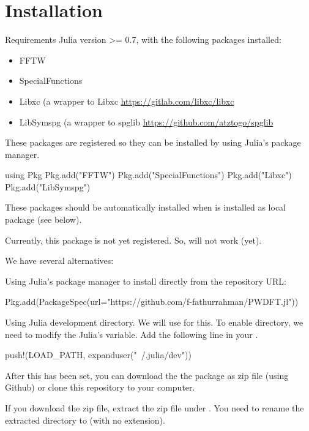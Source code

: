 \section{Installation}

Requirements Julia version >= 0.7, with the following packages installed:
\begin{itemize}
\item FFTW
\item SpecialFunctions
\item Libxc (a wrapper to Libxc {\footnotesize \url{https://gitlab.com/libxc/libxc}}
\item LibSymspg (a wrapper to spglib {\footnotesize \url{https://github.com/atztogo/spglib}}
\end{itemize}

These packages are registered so they can be installed by using Julia's package manager.

\begin{juliacode}
using Pkg
Pkg.add("FFTW")
Pkg.add("SpecialFunctions")
Pkg.add("Libxc")
Pkg.add("LibSymspg")
\end{juliacode}

These packages should be automatically installed when
 is installed as local package (see below).

Currently, this package is not yet registered.
So,  will not work (yet).

We have several alternatives:

Using Julia's package manager to install directly from the repository URL:

\begin{juliacode}
Pkg.add(PackageSpec(url="https://github.com/f-fathurrahman/PWDFT.jl"))  
\end{juliacode}

Using Julia development directory. We will use 
for this. To enable  directory, we need to modify the Julia's
 variable. Add the following line in your
.

\begin{juliacode}
push!(LOAD_PATH, expanduser("~/.julia/dev"))
\end{juliacode}

After this has been set, you can download the the package as zip file (using Github) or
clone this repository to your computer.

If you download the zip file, extract the zip file under
. You need to rename the extracted directory
to  (with no  extension).

